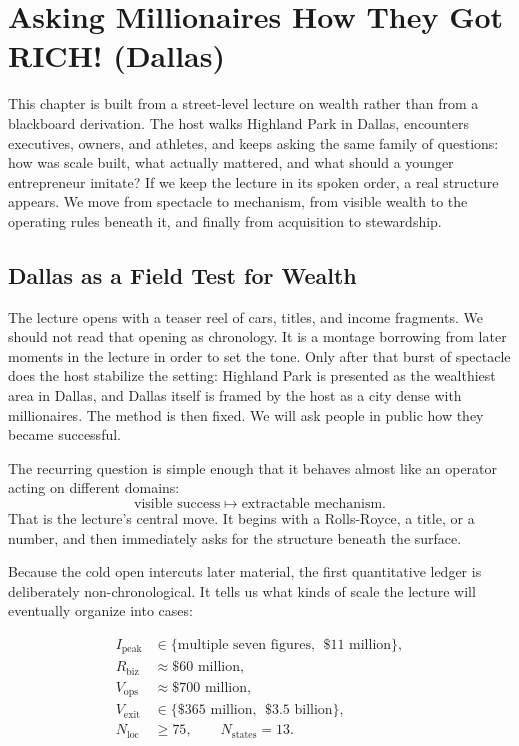 \chapter{Asking Millionaires How They Got RICH! (Dallas)}

This chapter is built from a street-level lecture on wealth rather than from a blackboard derivation. The host walks Highland Park in Dallas, encounters executives, owners, and athletes, and keeps asking the same family of questions: how was scale built, what actually mattered, and what should a younger entrepreneur imitate? If we keep the lecture in its spoken order, a real structure appears. We move from spectacle to mechanism, from visible wealth to the operating rules beneath it, and finally from acquisition to stewardship.

\section{Dallas as a Field Test for Wealth}

The lecture opens with a teaser reel of cars, titles, and income fragments. We should not read that opening as chronology. It is a montage borrowing from later moments in the lecture in order to set the tone. Only after that burst of spectacle does the host stabilize the setting: Highland Park is presented as the wealthiest area in Dallas, and Dallas itself is framed by the host as a city dense with millionaires. The method is then fixed. We will ask people in public how they became successful.

The recurring question is simple enough that it behaves almost like an operator acting on different domains:
\[
\text{visible success} \longmapsto \text{extractable mechanism}.
\]
That is the lecture's central move. It begins with a Rolls-Royce, a title, or a number, and then immediately asks for the structure beneath the surface.

Because the cold open intercuts later material, the first quantitative ledger is deliberately non-chronological. It tells us what kinds of scale the lecture will eventually organize into cases:

\begin{align}
I_{\mathrm{peak}} &\in \{\text{multiple seven figures},\ \ \$11\text{ million}\},\\
R_{\mathrm{biz}} &\approx \$60\text{ million},\\
V_{\mathrm{ops}} &\approx \$700\text{ million},\\
V_{\mathrm{exit}} &\in \{\$365\text{ million},\ \ \$3.5\text{ billion}\},\\
N_{\mathrm{loc}} &\ge 75,\qquad N_{\mathrm{states}} = 13.
\end{align}

